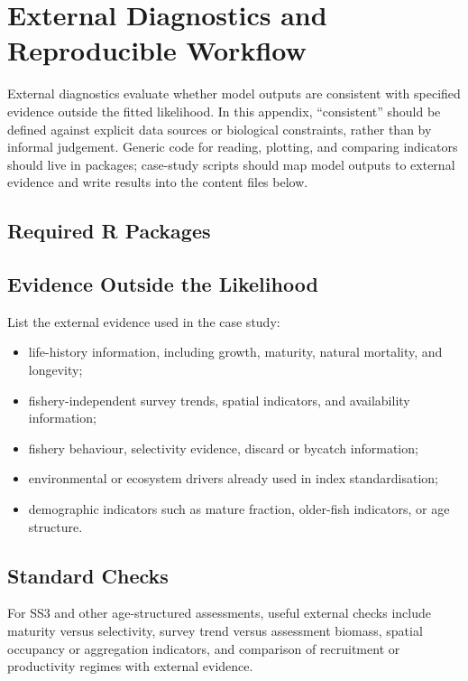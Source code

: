 \section{External Diagnostics and Reproducible Workflow}
\label{app:external}

External diagnostics evaluate whether model outputs are consistent with specified
evidence outside the fitted likelihood. In this appendix, ``consistent'' should be
defined against explicit data sources or biological constraints, rather than by informal
judgement. Generic code for reading, plotting, and comparing indicators should live in
packages; case-study scripts should map model outputs to external evidence and write
results into the content files below.

\subsection{Required R Packages}



\subsection{Evidence Outside the Likelihood}

List the external evidence used in the case study:

\begin{itemize}
  \item life-history information, including growth, maturity, natural mortality, and longevity;
  \item fishery-independent survey trends, spatial indicators, and availability information;
  \item fishery behaviour, selectivity evidence, discard or bycatch information;
  \item environmental or ecosystem drivers already used in index standardisation;
  \item demographic indicators such as mature fraction, older-fish indicators, or age structure.
\end{itemize}



\subsection{Standard Checks}

For SS3 and other age-structured assessments, useful external checks include maturity
versus selectivity, survey trend versus assessment biomass, spatial occupancy or aggregation
indicators, and comparison of recruitment or productivity regimes with external evidence.

